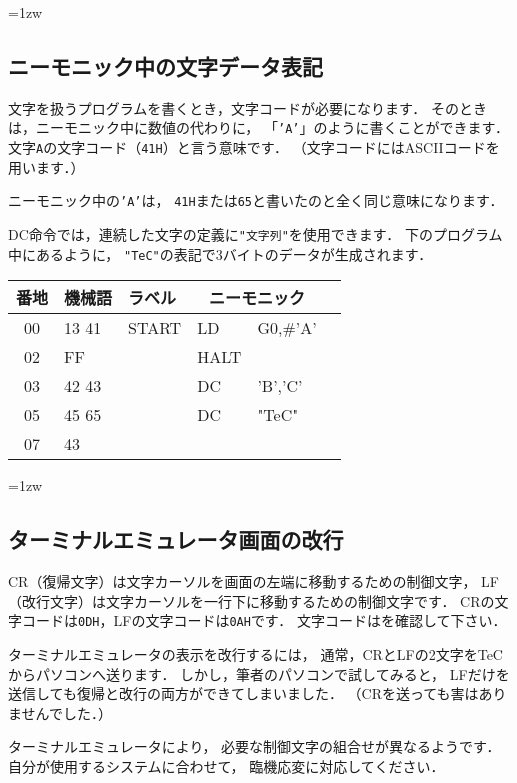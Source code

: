\begin{framed}{\parindent=1zw
\subsection*{ニーモニック中の文字データ表記}

文字を扱うプログラムを書くとき，文字コードが必要になります．
そのときは，ニーモニック中に数値の代わりに，
「{\tt 'A'}」のように書くことができます．
文字{\tt A}の文字コード（{\tt 41H}）と言う意味です．
（文字コードにはASCIIコードを用います．）

ニーモニック中の{\tt 'A'}は，
{\tt 41H}または{\tt 65}と書いたのと全く同じ意味になります．

DC命令では，連続した文字の定義に{\tt "文字列"}を使用できます．
下のプログラム中にあるように，
{\tt "TeC"}の表記で3バイトのデータが生成されます．

{\tt\small\begin{center}
\begin{tabular}{|c|l|l|l l|l}
\hline
番地 & 機械語 & ラベル & \multicolumn{2}{|c|}{ニーモニック} \\
\hline
00 & 13 41 & START & LD   & G0,\#'A'        \\
02 & FF    &       & HALT &                 \\ 
03 & 42 43 &       & DC   & 'B','C'         \\ 
05 & 45 65 &       & DC   & "TeC"           \\ 
07 & 43    &       &      &                 \\
\hline
\end{tabular}
\end{center}}
}\end{framed}

\begin{framed}{\parindent=1zw
\subsection*{ターミナルエミュレータ画面の改行}
CR（復帰文字）は文字カーソルを画面の左端に移動するための制御文字，
LF（改行文字）は文字カーソルを一行下に移動するための制御文字です．
CRの文字コードは{\tt 0DH}，LFの文字コードは{\tt 0AH}です．
文字コードはを確認して下さい．

ターミナルエミュレータの表示を改行するには，
通常，CRとLFの2文字をTeCからパソコンへ送ります．
しかし，筆者のパソコンで試してみると，
LFだけを送信しても復帰と改行の両方ができてしまいました．
（CRを送っても害はありませんでした．）

ターミナルエミュレータにより，
必要な制御文字の組合せが異なるようです．
自分が使用するシステムに合わせて，
臨機応変に対応してください．
}\end{framed}

